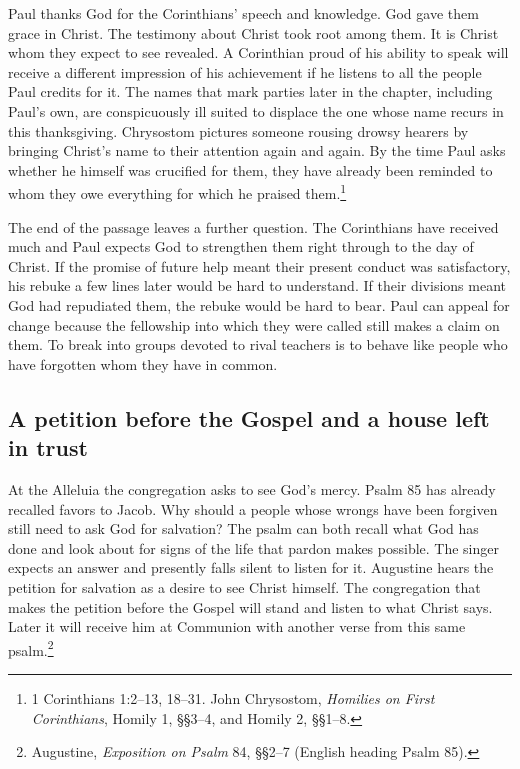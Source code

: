 Paul thanks God for the Corinthians' speech and knowledge. God gave them grace in Christ. The testimony about Christ took root among them. It is Christ whom they expect to see revealed. A Corinthian proud of his ability to speak will receive a different impression of his achievement if he listens to all the people Paul credits for it. The names that mark parties later in the chapter, including Paul's own, are conspicuously ill suited to displace the one whose name recurs in this thanksgiving. Chrysostom pictures someone rousing drowsy hearers by bringing Christ's name to their attention again and again. By the time Paul asks whether he himself was crucified for them, they have already been reminded to whom they owe everything for which he praised them.\footnote{1 Corinthians 1:2--13, 18--31. John Chrysostom, \textit{Homilies on First Corinthians}, Homily 1, §§3--4, and Homily 2, §§1--8.}

The end of the passage leaves a further question. The Corinthians have received much and Paul expects God to strengthen them right through to the day of Christ. If the promise of future help meant their present conduct was satisfactory, his rebuke a few lines later would be hard to understand. If their divisions meant God had repudiated them, the rebuke would be hard to bear. Paul can appeal for change because the fellowship into which they were called still makes a claim on them. To break into groups devoted to rival teachers is to behave like people who have forgotten whom they have in common.

\subsection{A petition before the Gospel and a house left in trust}

At the Alleluia the congregation asks to see God's mercy. Psalm 85 has already recalled favors to Jacob. Why should a people whose wrongs have been forgiven still need to ask God for salvation? The psalm can both recall what God has done and look about for signs of the life that pardon makes possible. The singer expects an answer and presently falls silent to listen for it. Augustine hears the petition for salvation as a desire to see Christ himself. The congregation that makes the petition before the Gospel will stand and listen to what Christ says. Later it will receive him at Communion with another verse from this same psalm.\footnote{Augustine, \textit{Exposition on Psalm} 84, §§2--7 (English heading Psalm 85).}

